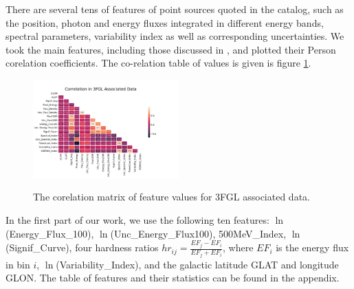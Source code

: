 There are several tens of features of point sources quoted in the catalog, such as the position, photon and energy fluxes integrated in different energy bands, spectral parameters, variability index as well as corresponding uncertainties. We took the main features, including those discussed in \cite{2016ApJ...820....8S}, and plotted their Person corelation coefficients. The co-relation table of values is given is figure \ref{fig:assoc_corr_3fgli}.
\begin{figure}[h]
\center
\includegraphics[width=0.5\textwidth]{plots/3fgl_assoc_cor.pdf}\\
\caption{The corelation matrix of feature values for 3FGL associated data.}
\label{fig:assoc_corr_3fgli}
\end{figure}
In the first part of our work, we use the following ten features:
$\ln$(Energy\_Flux\_100), $\ln$(Unc\_Energy\_Flux100), 500MeV\_Index, $\ln$(Signif\_Curve), 
four hardness ratios $hr_{ij} = \frac{EF_j - EF_i}{EF_j + EF_i}$, where $EF_i$ is the energy flux in bin $i$, $\ln$(Variability\_Index), and the galactic latitude GLAT and longitude GLON.
The table of features and their statistics can be found in the appendix.

